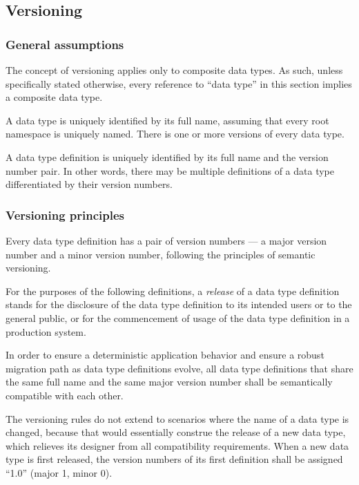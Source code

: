 \subsection{Versioning}

\subsubsection{General assumptions}

The concept of versioning applies only to composite data types.
As such, unless specifically stated otherwise, every reference to ``data type''
in this section implies a composite data type.

A data type is uniquely identified by its full name,
assuming that every root namespace is uniquely named.
There is one or more versions of every data type.

A data type definition is uniquely identified by its full name and the version number pair.
In other words, there may be multiple definitions of a data type differentiated by their version numbers.

\subsubsection{Versioning principles}

Every data type definition has a pair of version numbers ---
a major version number and a minor version number, following the principles of semantic versioning.

For the purposes of the following definitions, a \emph{release} of a data type definition stands for
the disclosure of the data type definition to its intended users or to the general public,
or for the commencement of usage of the data type definition in a production system.

In order to ensure a deterministic application behavior and ensure a robust migration path
as data type definitions evolve, all data type definitions that share the same
full name and the same major version number shall be semantically compatible with each other.

The versioning rules do not extend to scenarios where the name of a data type is changed,
because that would essentially construe the release of a new data type,
which relieves its designer from all compatibility requirements.
When a new data type is first released,
the version numbers of its first definition shall be assigned ``1.0'' (major 1, minor 0).

